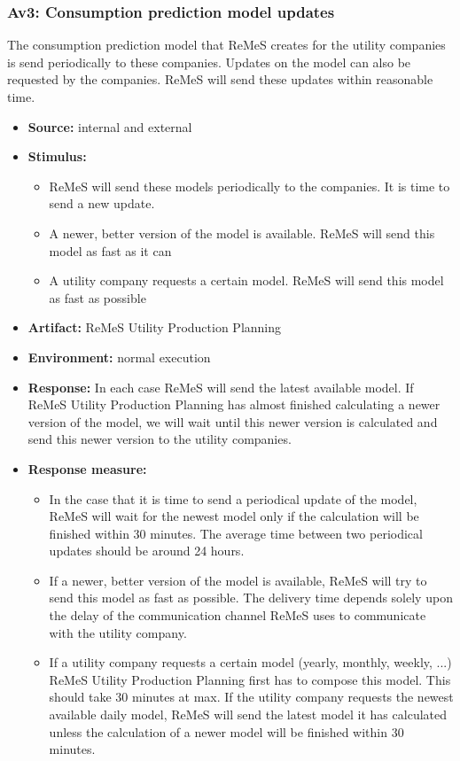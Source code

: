 \subsubsection{Av3: Consumption prediction model updates}
The consumption prediction model that ReMeS creates for the utility companies is send
periodically to these companies. Updates on the model can also be requested by the companies.
ReMeS will send these updates within reasonable time.
\begin{itemize}
	\item \textbf{Source:} internal and external
	\item \textbf{Stimulus:}
		\begin{itemize}
			\item ReMeS will send these models periodically to the companies. It is time to send a new update.
			\item A newer, better version of the model is available. ReMeS will send this model as fast as it can
			\item A utility company requests a certain model. ReMeS will send this model as fast as possible
		\end{itemize}
	\item \textbf{Artifact:} ReMeS Utility Production Planning
	\item \textbf{Environment:} normal execution
	\item \textbf{Response:} 
		In each case ReMeS will send the latest available model. If ReMeS Utility Production Planning has almost
			finished calculating a newer version of the model, we will wait until this newer version is calculated
			and send this newer version to the utility companies.
	\item \textbf{Response measure:} 
		\begin{itemize}
			\item In the case that it is time to send a periodical update of the model, ReMeS will wait for the newest model
				only if the calculation will be finished within 30 minutes. The average time between two periodical updates
				should be around 24 hours.
			\item If a newer, better version of the model is available, ReMeS will try to send this model as fast as possible. The
					delivery time depends solely upon the delay of the communication channel ReMeS uses to communicate with the
					utility company.
			\item If a utility company requests	a certain model (yearly, monthly, weekly, ...) ReMeS Utility Production Planning first
					has to compose this model. This should take 30 minutes at max. If the utility company requests the newest available
					daily model, ReMeS will send the latest model it has calculated unless the calculation of a newer model
					will be finished within 30 minutes.
		\end{itemize}
\end{itemize}